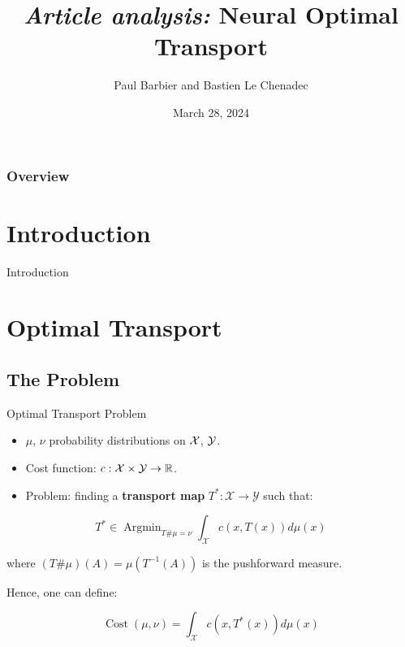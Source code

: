 \documentclass{beamer}
\title[Generative Images]{\textit{Article analysis:} Neural Optimal Transport} %
\author{Paul Barbier and Bastien Le Chenadec} %
\institute[MVA, Ponts] %
\date{March 28, 2024} %
\newcommand{\R}{\mathbb{R}}
\DeclareMathOperator*{\Argmin}{\text{Argmin}}
\DeclareMathOperator*{\Cost}{\text{Cost}}
\begin{document}
\begin{frame}
    \titlepage%
\end{frame}

\begin{frame}
    \frametitle{Overview} %
    \tableofcontents %
\end{frame}


\section{Introduction}
\begin{frame}{Introduction}

\end{frame}

\section{Optimal Transport}

\subsection{The Problem}
\begin{frame}{Optimal Transport Problem}
    \begin{itemize}
        \item $\mu$, $\nu$ probability distributions on ${\cal X}$, ${\cal Y}$.
        \item Cost function: $c:{\cal X}\times\mathcal{\cal Y}\to\R$.
        \item Problem: finding a \textbf{transport map} $T^*:\mathcal{X}\to \mathcal{Y}$ such that:
    \end{itemize}

    \begin{equation}
        T^* \in \Argmin_{T\#\mu=\nu} \int_{\mathcal{X}} c(x,T(x))d\mu(x)
    \end{equation}

    where $(T\#\mu)(A)=\mu(T^{-1}(A))$ is the pushforward measure.

    Hence, one can define:

    \begin{equation}
        \Cost(\mu,\nu) = \int_{\mathcal{X}} c(x,T^*(x))d\mu(x)
    \end{equation}

\end{frame}
\end{document}
